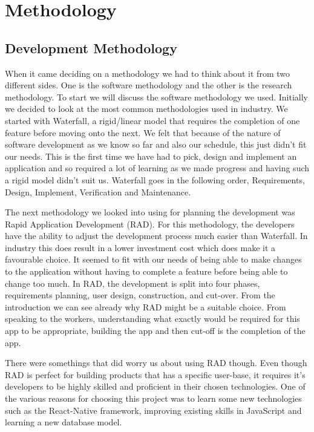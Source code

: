 \chapter{Methodology}
\section{Development Methodology}
When it came deciding on a methodology we had to think about it from two different sides. One is the software methodology and the other is the research methodology. To start we will discuss the software methodology we used. Initially we decided to look at the most common methodologies used in industry. We started with Waterfall, a rigid/linear model that requires the completion of one feature before moving onto the next\cite{heriyanti2020design}. We felt that because of the nature of software development as we know so far and also our schedule, this just didn't fit our needs. This is the first time we have had to pick, design and implement an application and so required a lot of learning as we made progress and having such a rigid model didn't suit us. Waterfall goes in the following order, Requirements, Design, Implement, Verification and Maintenance.

The next methodology we looked into using for planning the development was Rapid Application Development (RAD). For this methodology, the developers have the ability to adjust the development process much easier than Waterfall. In industry this does result in a lower investment cost which does make it a favourable choice\cite{rad}. It seemed to fit with our needs of being able to make changes to the application without having to complete a feature before being able to change too much. In RAD, the development is split into four phases, requirements planning, user design, construction, and cut-over. From the introduction we can see already why RAD might be a suitable choice. From speaking to the workers, understanding what exactly would be required for this app to be appropriate, building the app and then cut-off is the completion of the app. 

There were somethings that did worry us about using RAD though. Even though RAD is perfect for building products that has a specific user-base, it requires it's developers to be highly skilled and proficient in their chosen technologies\cite{rad}. One of the various reasons for choosing this project was to learn some new technologies such as the React-Native framework, improving existing skills in JavaScript and learning a new database model. 

